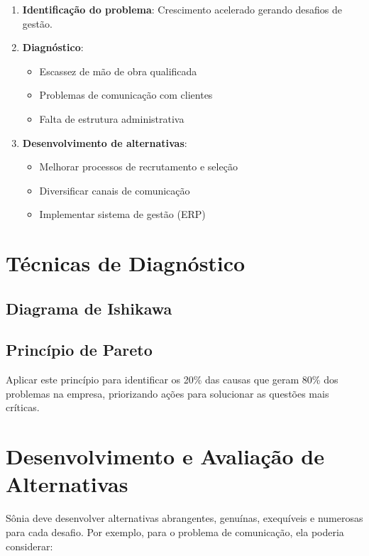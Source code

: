 \documentclass[11pt]{article}
\begin{document}
\begin{enumerate}
    \item \textbf{Identificação do problema}: Crescimento acelerado gerando desafios de gestão.
    \item \textbf{Diagnóstico}:
    \begin{itemize}
        \item Escassez de mão de obra qualificada
        \item Problemas de comunicação com clientes
        \item Falta de estrutura administrativa
    \end{itemize}
    \item \textbf{Desenvolvimento de alternativas}:
    \begin{itemize}
        \item Melhorar processos de recrutamento e seleção
        \item Diversificar canais de comunicação
        \item Implementar sistema de gestão (ERP)
    \end{itemize}
\end{enumerate}

\section{Técnicas de Diagnóstico}

\subsection{Diagrama de Ishikawa}




\subsection{Princípio de Pareto}
Aplicar este princípio para identificar os 20\% das causas que geram 80\% dos problemas na empresa, priorizando ações para solucionar as questões mais críticas.

\section{Desenvolvimento e Avaliação de Alternativas}

Sônia deve desenvolver alternativas abrangentes, genuínas, exequíveis e numerosas para cada desafio. Por exemplo, para o problema de comunicação, ela poderia considerar:
\end{document}
